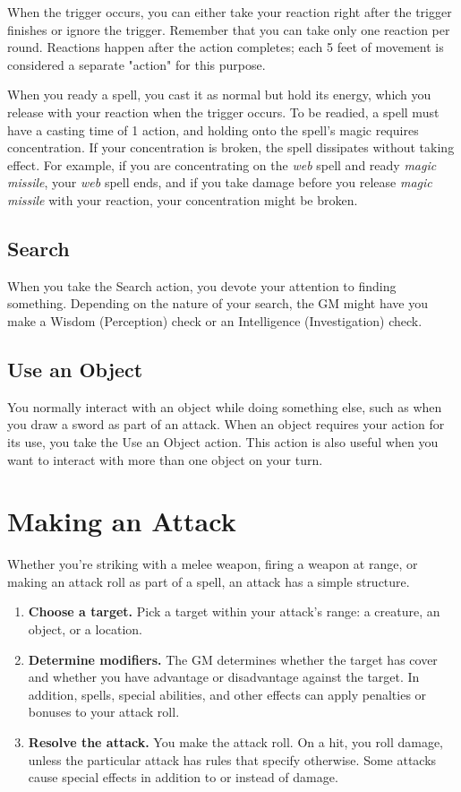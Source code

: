 When the trigger occurs, you can either take your reaction right after the trigger finishes or ignore the trigger. Remember that you can take only one reaction per round. Reactions happen after the action completes; each 5 feet of movement is considered a separate "action" for this purpose.

When you ready a spell, you cast it as normal but hold its energy, which you release with your reaction when the trigger occurs. To be readied, a spell must have a casting time of 1 action, and holding onto the spell's magic requires concentration. If your concentration is broken, the spell dissipates without taking effect. For example, if you are concentrating on the \textit{web} spell and ready \textit{magic missile}, your \textit{web} spell ends, and if you take damage before you release \textit{magic missile} with your reaction, your concentration might be broken.

\subsection{Search}

When you take the Search action, you devote your attention to finding something. Depending on the nature of your search, the GM might have you make a Wisdom (Perception) check or an Intelligence (Investigation) check.

\subsection{Use an Object}

You normally interact with an object while doing something else, such as when you draw a sword as part of an attack. When an object requires your action for its use, you take the Use an Object action. This action is also useful when you want to interact with more than one object on your turn.

\section{Making an Attack}

Whether you're striking with a melee weapon, firing a weapon at range, or making an attack roll as part of a spell, an attack has a simple structure.

\begin{enumerate}
\item \textbf{Choose a target.} Pick a target within your attack's range: a creature, an object, or a location.
\item \textbf{Determine modifiers.} The GM determines whether the target has cover and whether you have advantage or disadvantage against the target. In addition, spells, special abilities, and other effects can apply penalties or bonuses to your attack roll.
\item \textbf{Resolve the attack.} You make the attack roll. On a hit, you roll damage, unless the particular attack has rules that specify otherwise. Some attacks cause special effects in addition to or instead of damage.
\end{enumerate}


